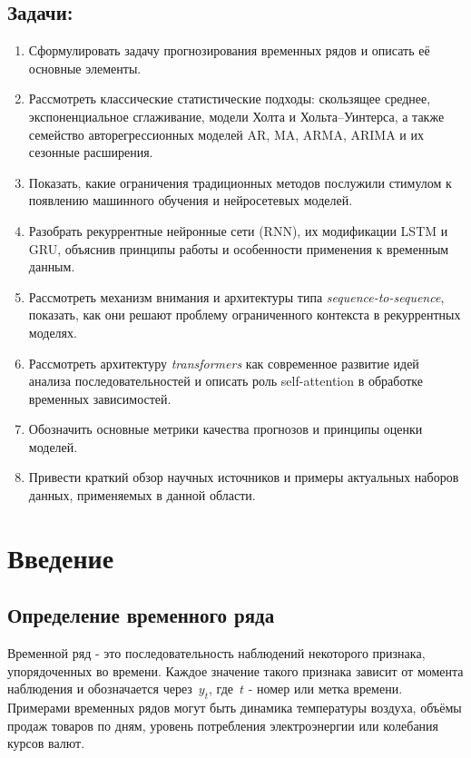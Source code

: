 \documentclass[12pt,a4paper]{article}
\begin{document}
\subsection{\textbf{Задачи:}}
\begin{enumerate}
    \item Сформулировать задачу прогнозирования временных рядов и описать её основные элементы.
    \item Рассмотреть классические статистические подходы: скользящее среднее, экспоненциальное сглаживание, модели Холта и Хольта–Уинтерса, а также семейство авторегрессионных моделей AR, MA, ARMA, ARIMA и их сезонные расширения.
    \item Показать, какие ограничения традиционных методов послужили стимулом к появлению машинного обучения и нейросетевых моделей.
    \item Разобрать рекуррентные нейронные сети (RNN), их модификации LSTM и GRU, объяснив принципы работы и особенности применения к временным данным.
    \item Рассмотреть механизм внимания и архитектуры типа \textit{sequence-to-sequence}, показать, как они решают проблему ограниченного контекста в рекуррентных моделях.
    \item Рассмотреть архитектуру \textit{transformers} как современное развитие идей анализа последовательностей и описать роль self-attention в обработке временных зависимостей.
    \item Обозначить основные метрики качества прогнозов и принципы оценки моделей.
    \item Привести краткий обзор научных источников и примеры актуальных наборов данных, применяемых в данной области.
\end{enumerate}

\clearpage
\tableofcontents
\thispagestyle{plain}


\clearpage
{}

\section{Введение} 

\subsection{Определение временного ряда}
Временной ряд - это последовательность наблюдений некоторого признака, упорядоченных во времени. Каждое значение такого признака зависит от момента наблюдения и обозначается через~$y_t$, где~$t$ - номер или метка времени.
Примерами временных рядов могут быть динамика температуры воздуха, объёмы продаж товаров по дням, уровень потребления электроэнергии или колебания курсов валют.
\end{document}
